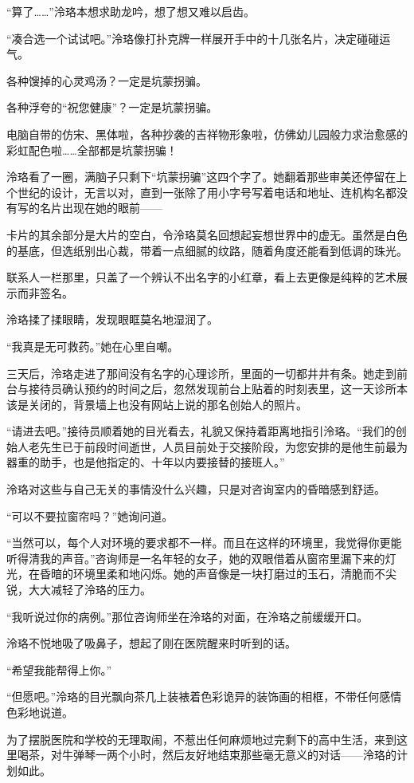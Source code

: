 \documentclass[UTF8, scheme = chinese, openany]{ctexbook}
\begin{document}
“算了……”泠珞本想求助龙吟，想了想又难以启齿。

“凑合选一个试试吧。”泠珞像打扑克牌一样展开手中的十几张名片，决定碰碰运气。

各种馊掉的心灵鸡汤？一定是坑蒙拐骗。

各种浮夸的“祝您健康”？一定是坑蒙拐骗。

电脑自带的仿宋、黑体啦，各种抄袭的吉祥物形象啦，仿佛幼儿园般力求治愈感的彩虹配色啦……全部都是坑蒙拐骗！

泠珞看了一圈，满脑子只剩下“坑蒙拐骗”这四个字了。她翻着那些审美还停留在上个世纪的设计，无言以对，直到一张除了用小字号写着电话和地址、连机构名都没有写的名片出现在她的眼前——

卡片的其余部分是大片的空白，令泠珞莫名回想起妄想世界中的虚无。虽然是白色的基底，但选纸别出心裁，带着一点细腻的纹路，随着角度还能看到低调的珠光。

联系人一栏那里，只盖了一个辨认不出名字的小红章，看上去更像是纯粹的艺术展示而非签名。

泠珞揉了揉眼睛，发现眼眶莫名地湿润了。

“我真是无可救药。”她在心里自嘲。

三天后，泠珞走进了那间没有名字的心理诊所，里面的一切都井井有条。她走到前台与接待员确认预约的时间之后，忽然发现前台上贴着的时刻表里，这一天诊所本该是关闭的，背景墙上也没有网站上说的那名创始人的照片。

“请进去吧。”接待员顺着她的目光看去，礼貌又保持着距离地指引泠珞。“我们的创始人老先生已于前段时间逝世，人员目前处于交接阶段，为您安排的是他生前最为器重的助手，也是他指定的、十年以内要接替的接班人。”

泠珞对这些与自己无关的事情没什么兴趣，只是对咨询室内的昏暗感到舒适。

“可以不要拉窗帘吗？”她询问道。

“当然可以，每个人对环境的要求都不一样。而且在这样的环境里，我觉得你更能听得清我的声音。”咨询师是一名年轻的女子，她的双眼借着从窗帘里漏下来的灯光，在昏暗的环境里柔和地闪烁。她的声音像是一块打磨过的玉石，清脆而不尖锐，大大减轻了泠珞的压力。

“我听说过你的病例。”那位咨询师坐在泠珞的对面，在泠珞之前缓缓开口。

泠珞不悦地吸了吸鼻子，想起了刚在医院醒来时听到的话。

“希望我能帮得上你。”

“但愿吧。”泠珞的目光飘向茶几上装裱着色彩诡异的装饰画的相框，不带任何感情色彩地说道。

为了摆脱医院和学校的无理取闹，不惹出任何麻烦地过完剩下的高中生活，来到这里喝茶，对牛弹琴一两个小时，然后友好地结束那些毫无意义的对话——泠珞的计划如此。
\end{document}
